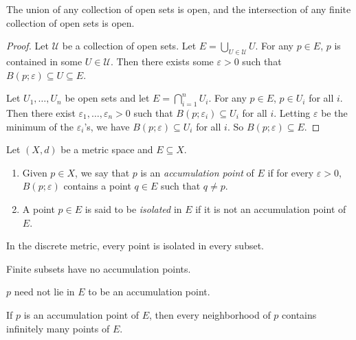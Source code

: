 \begin{proposition}
    The union of any collection of open sets is open, and the intersection
    of any finite collection of open sets is open.
\end{proposition}
\begin{proof}
    Let $\mathscr{U}$ be a collection of open sets.
    Let $E = \bigcup_{U \in \mathscr{U}} U$.
    For any $p \in E$, $p$ is contained in some $U \in \mathscr{U}$.
    Then there exists some $\varepsilon > 0$ such that $B(p; \varepsilon)
    \subseteq U \subseteq E$.

    Let $U_1, \dots, U_n$ be open sets and let $E = \bigcap_{i=1}^n U_i$.
    For any $p \in E$, $p \in U_i$ for all $i$.
    Then there exist $\varepsilon_1, \dots, \varepsilon_n > 0$ such that
    $B(p; \varepsilon_i) \subseteq U_i$ for all $i$.
    Letting $\varepsilon$ be the minimum of the $\varepsilon_i$'s, we have
    $B(p; \varepsilon) \subseteq U_i$ for all $i$.
    So $B(p; \varepsilon) \subseteq E$.
\end{proof}

\begin{definition}
    Let $(X, d)$ be a metric space and $E \subseteq X$.
    \begin{enumerate}
        \item Given $p \in X$, we say that $p$ is an \emph{accumulation
        point} of $E$ if for every $\varepsilon > 0$, $B(p; \varepsilon)$
        contains a point $q \in E$ such that $q \ne p$.
        \item A point $p \in E$ is said to be \emph{isolated} in $E$ if it
        is not an accumulation point of $E$.
    \end{enumerate}
\end{definition}

\begin{examples}
    \item In the discrete metric, every point is isolated in every subset.
    \item Finite subsets have no accumulation points.
\end{examples}

\begin{remarks}
    \item $p$ need not lie in $E$ to be an accumulation point.
    \item If $p$ is an accumulation point of $E$, then every neighborhood of
    $p$ contains infinitely many points of $E$.
\end{remarks}
